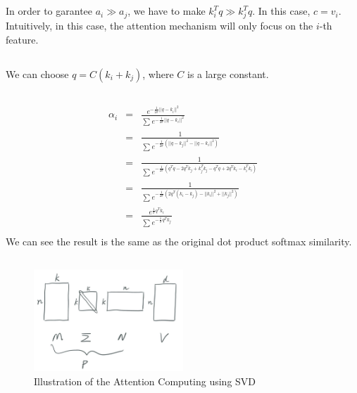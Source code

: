 \documentclass[12pt]{article}
\begin{document}
\subsection{}
In order to garantee $a_i \gg a_j$, we have to make $k_i^T q \gg k_j^T q$. In this case, $c = v_i$. Intuitively, in this case, the attention mechanism will only focus on the $i$-th feature.

\subsection{}
We can choose $q = C(k_i + k_j)$, where $C$ is a large constant.

\subsection{}
\begin{eqnarray}
\alpha_i &=& \frac{e^{-\frac{1}{2\sigma}||q - k_i||^2}}{\sum_{}^{}e^{-\frac{1}{2\sigma}||q - k_i||^2}} \nonumber \\
&=& \frac{1}{\sum_{}^{}e^{-\frac{1}{2\sigma}(||q-k_j||^2 - ||q-k_i||^2)}} \nonumber \\
&=& \frac{1}{\sum_{}^{}e^{-\frac{1}{2\sigma}(q^Tq - 2q^Tk_j + k_j^Tk_j - q^Tq + 2q^Tk_i - k_i^Tk_i)}} \nonumber \\
&=& \frac{1}{\sum_{}^{}e^{-\frac{1}{2\sigma}(2q^T(k_i - k_j) - ||k_i||^2 + ||k_j||^2)}} \nonumber \\
&=& \frac{e^{\frac{1}{\sigma}q^T k_i}}{\sum_{}^{}e^{-\frac{1}{\sigma}q^T k_j}} \nonumber \\
\end{eqnarray}
We can see the result is the same as the original dot product softmax similarity.

\subsection{}
\begin{figure}[h]
    \centering
    \includegraphics[width=0.5\textwidth]{imgs/5-5.png}
    \caption{Illustration of the Attention Computing using SVD}
    \label{fig:5-5}
\end{figure}
\end{document}
